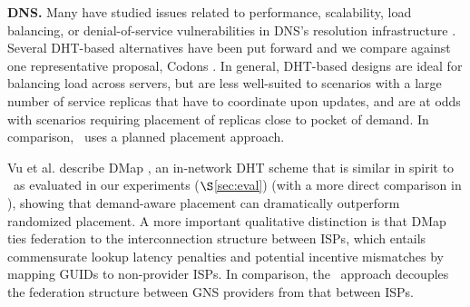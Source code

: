 
{\bf{DNS.}} Many have studied issues related to performance, scalability, load balancing, or denial-of-service vulnerabilities in DNS's resolution infrastructure \cite{Pappas,codons-paper,Brownlee,dnssec}. Several DHT-based alternatives have been put forward \cite{codons-paper,cox,DHTdns} and we compare against one representative proposal, Codons \cite{codons-paper}. In general, DHT-based designs are ideal for balancing load across servers, but are less well-suited to scenarios with a large number of service replicas that have to coordinate upon updates, and are at odds with scenarios requiring placement of replicas close to pocket of demand. In comparison, \auspice\ uses a planned placement approach.

Vu et al. describe DMap \cite{VuICDCS12}, an in-network DHT scheme %
that is similar in spirit to \staticthree\ as evaluated in our experiments ($\S$\ref{sec:eval}) (with a more direct comparison in \cite{techreport}), showing that demand-aware placement can dramatically outperform randomized placement. A more important qualitative distinction is that DMap ties federation to the interconnection structure between ISPs, which entails commensurate lookup latency penalties and potential incentive mismatches by mapping GUIDs to non-provider ISPs. In comparison, the \auspice\ approach decouples the federation structure between GNS providers from that between ISPs.


